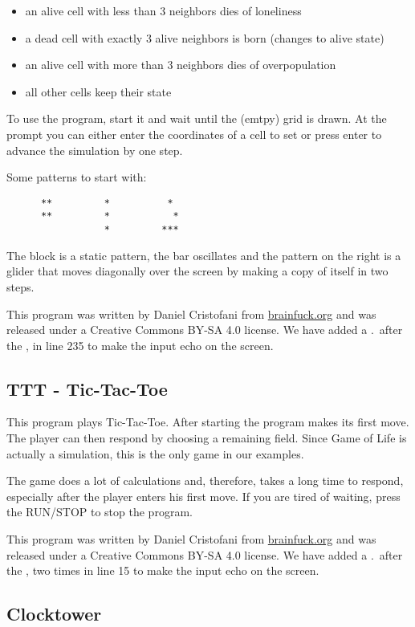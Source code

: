 \documentclass[ms,article,a4paper]{memoir}
\begin{document}
\begin{itemize}
\item an alive cell with less than 3 neighbors dies of loneliness
\item a dead cell with exactly 3 alive neighbors is born (changes to alive state)
\item an alive cell with more than 3 neighbors dies of overpopulation
\item all other cells keep their state
\end{itemize}

To use the program, start it and wait until the (emtpy) grid is drawn. At the prompt you can either enter the coordinates of a cell to set or press enter to advance the simulation by one step.

Some patterns to start with:

\begin{verbatim}
      **         *          *
      **         *           *
                 *         ***
\end{verbatim}

The block is a static pattern, the bar oscillates and the pattern on the right is a glider that moves diagonally over the screen by making a copy of itself in two steps.

This program was written by Daniel Cristofani from \url{brainfuck.org} and was released under a Creative Commons BY-SA 4.0 license. We have added a .\ after the , in line 235 to make the input echo on the screen.

\subsection{TTT - Tic-Tac-Toe}

This program plays Tic-Tac-Toe. After starting the program makes its first move. The player can then respond by choosing a remaining field. Since Game of Life is actually a simulation, this is the only game in our examples.

The game does a lot of calculations and, therefore, takes a long time to respond, especially after the player enters his first move. If you are tired of waiting, press the RUN/STOP to stop the program.

This program was written by Daniel Cristofani from \url{brainfuck.org} and was released under a Creative Commons BY-SA 4.0 license. We have added a .\ after the , two times in line 15 to make the input echo on the screen.

\subsection{Clocktower}
\end{document}
